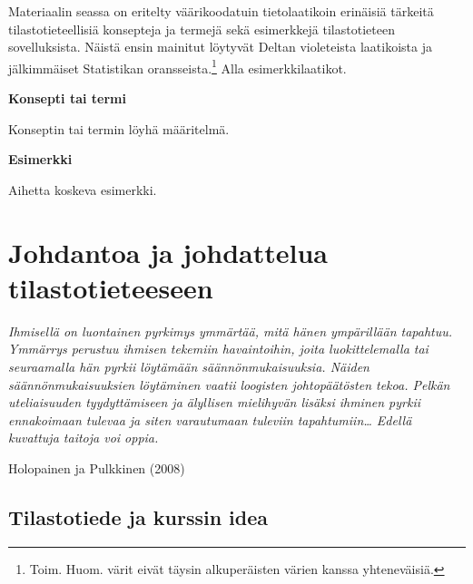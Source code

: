 \documentclass[
]{book}
\begin{document}
Materiaalin seassa on eritelty väärikoodatuin tietolaatikoin erinäisiä tärkeitä tilastotieteellisiä konsepteja ja termejä sekä esimerkkejä tilastotieteen sovelluksista. Näistä ensin mainitut löytyvät Deltan violeteista laatikoista ja jälkimmäiset Statistikan oransseista.\footnote{Toim. Huom. värit eivät täysin alkuperäisten värien kanssa yhteneväisiä.} Alla esimerkkilaatikot.

\begin{defblock}{}
\textbf{Konsepti tai termi}

Konseptin tai termin löyhä määritelmä.

\end{defblock}

\begin{eblock}{}
\textbf{Esimerkki}

Aihetta koskeva esimerkki.

\end{eblock}

\hypertarget{johdantoa-ja-johdattelua-tilastotieteeseen}{%
\chapter{Johdantoa ja johdattelua tilastotieteeseen}\label{johdantoa-ja-johdattelua-tilastotieteeseen}}

\emph{Ihmisellä on luontainen pyrkimys ymmärtää, mitä hänen ympärillään tapahtuu. Ymmärrys perustuu ihmisen tekemiin havaintoihin, joita luokittelemalla tai seuraamalla hän pyrkii löytämään säännönmukaisuuksia. Näiden säännönmukaisuuksien löytäminen vaatii loogisten johtopäätösten tekoa. Pelkän uteliaisuuden tyydyttämiseen ja älyllisen mielihyvän lisäksi ihminen pyrkii ennakoimaan tulevaa ja siten varautumaan tuleviin tapahtumiin\ldots{} Edellä kuvattuja taitoja voi oppia.}

Holopainen ja Pulkkinen (2008)

\hypertarget{tilastotiede-ja-kurssin-idea}{%
\section{Tilastotiede ja kurssin idea}\label{tilastotiede-ja-kurssin-idea}}
\end{document}
